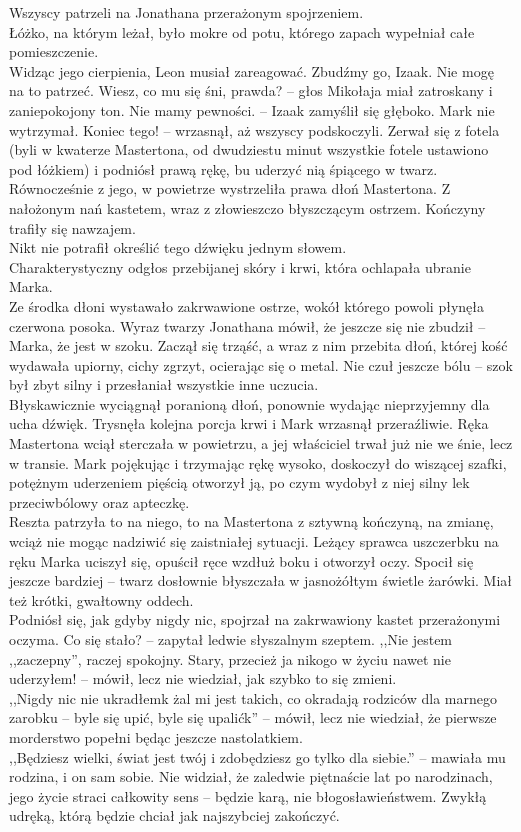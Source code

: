\documentclass[../MAIN.tex]{subfiles}
\begin{document}
Wszyscy patrzeli na Jonathana przerażonym spojrzeniem. \\
Łóżko, na którym leżał, było mokre od potu, którego zapach wypełniał całe pomieszczenie. \\
Widząc jego cierpienia, Leon musiał zareagować.
\sx Zbudźmy go, Izaak. Nie mogę na to patrzeć.
\xx Wiesz, co mu się śni, prawda? -- głos Mikołaja miał zatroskany i zaniepokojony ton.
\xx Nie mamy pewności. -- Izaak zamyślił się głęboko.
\qd
Mark nie wytrzymał.
\sx Koniec tego! -- wrzasnął, aż wszyscy podskoczyli.
\qd
Zerwał się z fotela (byli w kwaterze Mastertona, od dwudziestu minut wszystkie fotele ustawiono pod łóżkiem) i podniósł prawą rękę, bu uderzyć nią śpiącego w twarz. Równocześnie z jego, w powietrze wystrzeliła prawa dłoń Mastertona. Z nałożonym nań kastetem, wraz z złowieszczo błyszczącym ostrzem.
Kończyny trafiły się nawzajem. \\
Nikt nie potrafił określić tego dźwięku jednym słowem. \\
Charakterystyczny odgłos przebijanej skóry i krwi, która ochlapała ubranie Marka. \\
Ze środka dłoni wystawało zakrwawione ostrze, wokół którego powoli płynęła czerwona posoka. Wyraz twarzy Jonathana mówił, że jeszcze się nie zbudził -- Marka, że jest w szoku. Zaczął się trząść, a wraz z nim przebita dłoń, której kość wydawała upiorny, cichy zgrzyt, ocierając się o metal. Nie czuł jeszcze bólu -- szok był zbyt silny i przesłaniał wszystkie inne uczucia. \\
Błyskawicznie wyciągnął poranioną dłoń, ponownie wydając nieprzyjemny dla ucha dźwięk. Trysnęła kolejna porcja krwi i Mark wrzasnął przeraźliwie. Ręka Mastertona wciął sterczała w powietrzu, a jej właściciel trwał już nie we śnie, lecz w transie. Mark pojękując i trzymając rękę wysoko, doskoczył do wiszącej szafki, potężnym uderzeniem pięścią otworzył ją, po czym wydobył z niej silny lek przeciwbólowy oraz apteczkę. \\
Reszta patrzyła to na niego, to na Mastertona z sztywną kończyną, na zmianę, wciąż nie mogąc nadziwić się zaistniałej sytuacji. Leżący sprawca uszczerbku na ręku Marka uciszył się, opuścił ręce wzdłuż boku i otworzył oczy. Spocił się jeszcze bardziej -- twarz dosłownie błyszczała w jasnożółtym świetle żarówki. Miał też krótki, gwałtowny oddech. \\
Podniósł się, jak gdyby nigdy nic, spojrzał na zakrwawiony kastet przerażonymi oczyma.
\sx Co się stało? -- zapytał ledwie słyszalnym szeptem. \qd
%
,,Nie jestem ,,zaczepny'', raczej spokojny. Stary, przecież ja nikogo w życiu nawet nie uderzyłem! -- mówił, lecz nie wiedział, jak szybko to się zmieni. \\
,,Nigdy nic nie ukradłem\3k żal mi jest takich, co okradają rodziców dla marnego zarobku -- byle się upić, byle się upalić\3k'' -- mówił, lecz nie wiedział, że pierwsze morderstwo popełni będąc jeszcze nastolatkiem. \\
,,Będziesz wielki, świat jest twój i zdobędziesz go tylko dla siebie.'' -- mawiała mu rodzina, i on sam sobie. Nie widział, że zaledwie piętnaście lat po narodzinach, jego życie straci całkowity sens -- będzie karą, nie błogosławieństwem. Zwykłą udręką, którą będzie chciał jak najszybciej zakończyć.
\end{document}
